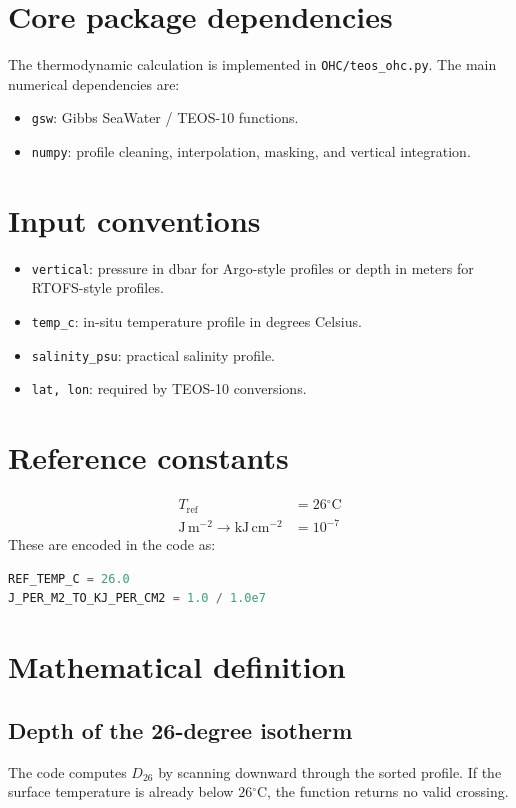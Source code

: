 \documentclass[11pt]{report}
\newcommand{\code}[1]{\texttt{#1}}
\newcommand{\celsius}{\ensuremath{^{\circ}\mathrm{C}}}
\newcommand{\Dtwentysix}{\ensuremath{D_{26}}}
\begin{document}
\section{Core package dependencies}
The thermodynamic calculation is implemented in \code{OHC/teos\_ohc.py}. The main numerical dependencies are:
\begin{itemize}[leftmargin=1.3em]
  \item \code{gsw}: Gibbs SeaWater / TEOS-10 functions.
  \item \code{numpy}: profile cleaning, interpolation, masking, and vertical integration.
\end{itemize}

\section{Input conventions}
\begin{itemize}[leftmargin=1.3em]
  \item \code{vertical}: pressure in dbar for Argo-style profiles or depth in meters for RTOFS-style profiles.
  \item \code{temp\_c}: in-situ temperature profile in degrees Celsius.
  \item \code{salinity\_psu}: practical salinity profile.
  \item \code{lat, lon}: required by TEOS-10 conversions.
\end{itemize}

\section{Reference constants}
\begin{align}
T_{\mathrm{ref}} &= 26\celsius{} \\
\mathrm{J\,m^{-2}} \to \mathrm{kJ\,cm^{-2}} &= 10^{-7}
\end{align}
These are encoded in the code as:
\begin{lstlisting}[language=Python]
REF_TEMP_C = 26.0
J_PER_M2_TO_KJ_PER_CM2 = 1.0 / 1.0e7
\end{lstlisting}

\section{Mathematical definition}
\subsection{Depth of the 26-degree isotherm}
The code computes \Dtwentysix{} by scanning downward through the sorted profile. If the surface temperature is already below \(26\celsius{}\), the function returns no valid crossing.
\end{document}
